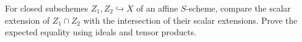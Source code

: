 \begin{problem}\label{chall:vi24-04}
For closed subschemes $Z_1,Z_2\hookrightarrow X$ of an affine $S$-scheme, compare the scalar extension of $Z_1\cap Z_2$ with the intersection of their scalar extensions. Prove the expected equality using ideals and tensor products.
\end{problem}
